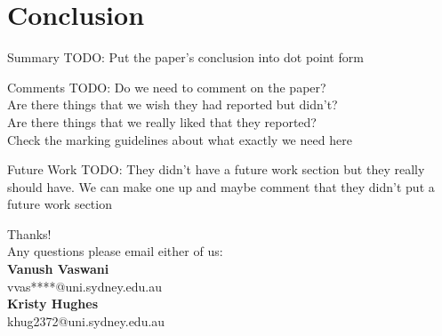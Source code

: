 \documentclass{lecture}
\begin{document}
\section[Conclusion]{Conclusion}
\begin{plain}{Summary}
TODO: Put the paper's conclusion into dot point form
\end{plain}

\begin{plain}{Comments}
TODO: Do we need to comment on the paper?\\
Are there things that we wish they had reported but didn't?\\
Are there things that we really liked that they reported?\\
Check the marking guidelines about what exactly we need here\\
\end{plain}

\begin{plain}{Future Work}
TODO: They didn't have a future work section but they really should have. We can make one up and maybe comment that they didn't put a future work section
\end{plain}

\begin{plain}{}
\begin{center}
\Huge
Thanks!\\
\vspace{3ex}
\Large
Any questions please email either of us:\\
\vspace{2ex}
\large
\textbf{Vanush Vaswani}\\
\normalsize
vvas****@uni.sydney.edu.au\\
\vspace{1ex}
\large
\textbf{Kristy Hughes}\\
\normalsize
khug2372@uni.sydney.edu.au
\end{center}
\end{plain}
\end{document}
